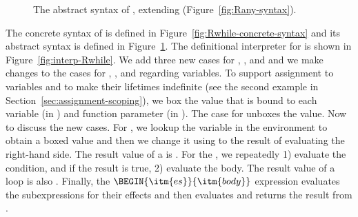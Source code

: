 \documentclass[11pt]{book}
\newcommand{\gray}[1]{{\color{gray} #1}}
\begin{document}
\begin{figure}[tp]
\centering
\fbox{
  \begin{minipage}{0.96\textwidth}
    \small
\[
\begin{array}{lcl}
  \Exp &::=& \gray{ \INT{\Int} \VAR{\Var} \mid \LET{\Var}{\Exp}{\Exp} } \\
       &\mid& \gray{ \PRIM{\itm{op}}{\Exp\ldots} }\\
     &\mid& \gray{ \BOOL{\itm{bool}}
      \mid \IF{\Exp}{\Exp}{\Exp} } \\
     &\mid& \gray{ \VOID{} \mid \LP\key{HasType}~\Exp~\Type \RP 
     \mid \APPLY{\Exp}{\Exp\ldots} }\\
  &\mid& \gray{ \LAMBDA{\LP\LS\Var\code{:}\Type\RS\ldots\RP}{\Type}{\Exp} }\\
  &\mid& \SETBANG{\Var}{\Exp} \mid \BEGIN{\LP\Exp\ldots\RP}{\Exp}
   \mid \WHILE{\Exp}{\Exp} \\
 \Def &::=& \gray{ \FUNDEF{\Var}{\LP\LS\Var \code{:} \Type\RS\ldots\RP}{\Type}{\code{'()}}{\Exp} }\\
  \LangLoop{} &::=& \gray{ \PROGRAMDEFSEXP{\code{'()}}{\LP\Def\ldots\RP}{\Exp} }
\end{array}
\]
\end{minipage}
}
\caption{The abstract syntax of \LangLoop{}, extending \LangAny{} (Figure~\ref{fig:Rany-syntax}).}
\label{fig:Rwhile-syntax}
\end{figure}

The concrete syntax of \LangLoop{} is defined in
Figure~\ref{fig:Rwhile-concrete-syntax} and its abstract syntax is defined
in Figure~\ref{fig:Rwhile-syntax}.
%
The definitional interpreter for \LangLoop{} is shown in
Figure~\ref{fig:interp-Rwhile}. We add three new cases for ,
, and  and we make changes to the cases
for , , and  regarding variables. To
support assignment to variables and to make their lifetimes indefinite
(see the second example in Section~\ref{sec:assignment-scoping}), we
box the value that is bound to each variable (in ) and
function parameter (in ). The case for  unboxes
the value.
%
Now to discuss the new cases. For , we lookup the
variable in the environment to obtain a boxed value and then we change
it using  to the result of evaluating the right-hand
side.  The result value of a  is .
%
For the , we repeatedly 1) evaluate the condition, and
if the result is true, 2) evaluate the body.
The result value of a  loop is also .
%
Finally, the $\BEGIN{\itm{es}}{\itm{body}}$ expression evaluates the
subexpressions  for their effects and then evaluates
and returns the result from .
\end{document}
